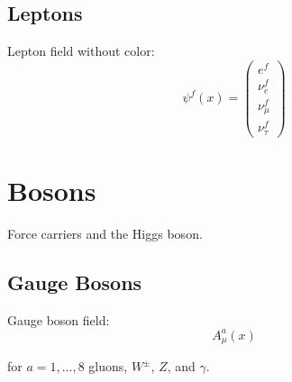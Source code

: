 \subsection{Leptons}

\begin{definition}
\label{def:lepton}
Lepton field without color:
\begin{equation}
\psi^f(x) = \begin{pmatrix}e^f \\ \nu_e^f \\ \nu_\mu^f \\ \nu_\tau^f\end{pmatrix}
\end{equation}
\end{definition}

\begin{table}[h]
\centering
\caption{Lepton Properties}
\end{table}

\section{Bosons}

Force carriers and the Higgs boson.

\subsection{Gauge Bosons}

\begin{definition}
\label{def:gauge-boson}
Gauge boson field:
\begin{equation}
A_\mu^a(x)
\end{equation}

for $a = 1,\ldots,8$ gluons, $W^\pm$, $Z$, and $\gamma$.
\end{definition}

